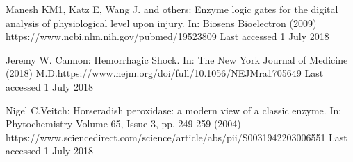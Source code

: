 \documentclass[runningheads]{llncs}
\begin{document}
\begin{thebibliography}{8}
	Manesh KM1, Katz E, Wang J. and others:
	Enzyme logic gates for the digital analysis of physiological level upon injury. In: Biosens Bioelectron (2009) https://www.ncbi.nlm.nih.gov/pubmed/19523809 Last accessed 1 July 2018
	
	Jeremy W. Cannon: Hemorrhagic Shock. In: The New York Journal of Medicine (2018) M.D.https://www.nejm.org/doi/full/10.1056/NEJMra1705649 Last accessed 1 July 2018
	
	Nigel C.Veitch: Horseradish peroxidase: a modern view of a classic enzyme. In: Phytochemistry
	Volume 65, Issue 3, pp. 249-259 (2004)
	https://www.sciencedirect.com/science/article/abs/pii/S0031942203006551  Last accessed 1 July 2018
	
	
\end{thebibliography}
\end{document}

